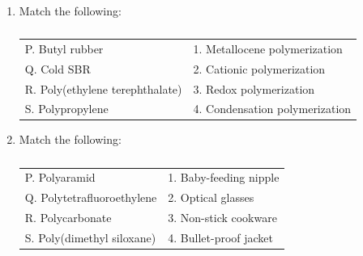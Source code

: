 \documentclass[a4paper,10pt]{article}
\begin{document}
\begin{enumerate}
    \item Match the following:
    \begin{table}[h!] \centering \caption*{} \label{tab:q10_poly_2018}
        \begin{tabular}{|l|l|} \hline
        P. Butyl rubber & 1. Metallocene polymerization \\
        Q. Cold SBR & 2. Cationic polymerization \\
        R. Poly(ethylene terephthalate) & 3. Redox polymerization \\
        S. Polypropylene & 4. Condensation polymerization \\ \hline
        \end{tabular}
    \end{table}
    \hfill{}
    \begin{enumerate}[label=\Alph*)]
    \end{enumerate}

    \item Match the following:
    \begin{table}[h!] \centering \caption*{} \label{tab:q11_poly_2018}
        \begin{tabular}{|l|l|} \hline
        P. Polyaramid & 1. Baby-feeding nipple \\
        Q. Polytetrafluoroethylene & 2. Optical glasses \\
        R. Polycarbonate & 3. Non-stick cookware \\
        S. Poly(dimethyl siloxane) & 4. Bullet-proof jacket \\ \hline
        \end{tabular}
    \end{table}
    \hfill{}
    \begin{enumerate}[label=\Alph*)]
    \end{enumerate}


\end{enumerate}
\end{document}

